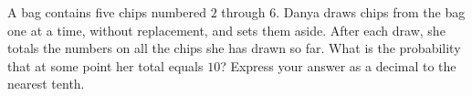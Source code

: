 A bag contains five chips numbered $2$ through $6$. Danya draws chips from the bag one at a time, without replacement, and sets them aside. After each draw, she totals the numbers on all the chips she has drawn so far. What is the probability that at some point her total equals $10$? Express your answer as a decimal to the nearest tenth.
